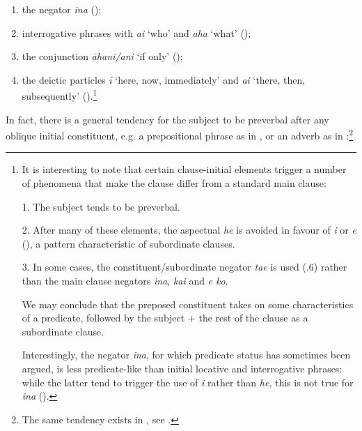\begin{enumerate}
\item 
the negator \textit{{\ꞌ}ina} ();

\item 
interrogative phrases with \textit{ai} ‘who’ and \textit{aha} ‘what’ ();

\item 
the conjunction \textit{{\ꞌ}āhani}\textit{/{\ꞌ}ani} ‘if only’ ();

\item 
the deictic particles \textit{{\ꞌ}ī} ‘here, now, immediately’ and \textit{{\ꞌ}ai} ‘there, then, subsequently’ ().\footnote{\label{fn:420}It is interesting to note that certain clause-initial elements trigger a number of phenomena that make the clause differ from a standard main clause:

1. The subject tends to be preverbal.

2. After many of these elements, the aspectual \textit{he} is avoided in favour of \textit{i} or \textit{e} (), a pattern characteristic of subordinate clauses.

3. In some cases, the constituent/subordinate negator \textit{ta{\ꞌ}e} is used (.6) rather than the main clause negators \textit{{\ꞌ}ina}, \textit{kai} and \textit{e ko}.

We may conclude that the preposed constituent takes on some characteristics of a predicate, followed by the subject + the rest of the clause as a subordinate clause. 

Interestingly, the negator \textit{{\ꞌ}ina}, for which predicate status has sometimes been argued, is less predicate-like than initial locative and interrogative phrases: while the latter tend to trigger the use of \textit{i} rather than \textit{he}, this is not true for \textit{{\ꞌ}ina} ().}

\end{enumerate}

In fact, there is a general tendency for the subject to be preverbal after any oblique initial constituent, e.g. a prepositional phrase as in , or an adverb as in :\footnote{\label{fn:421}The same tendency exists in , see \citet[96]{Harlow2007Subject}.}


